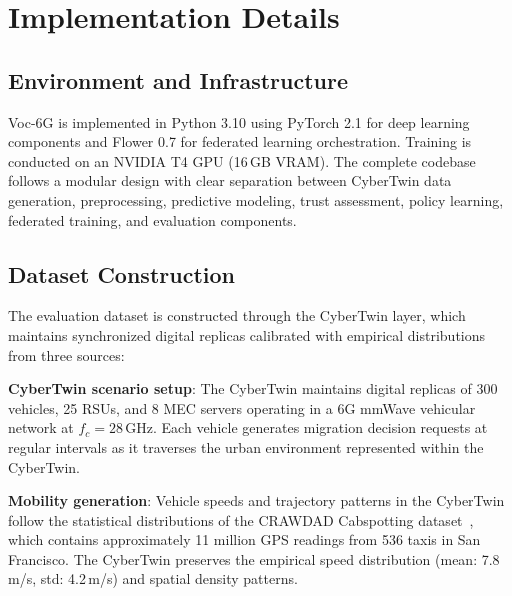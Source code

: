 \documentclass[journal,twoside]{IEEEtran}
\newcommand{\VocSixG}{Voc-6G}
\begin{document}
\section{Implementation Details}
\label{sec:implementation}

\subsection{Environment and Infrastructure}

\VocSixG{} is implemented in Python 3.10 using PyTorch 2.1 for deep learning components and Flower 0.7 for federated learning orchestration. Training is conducted on an NVIDIA T4 GPU (16\,GB VRAM). The complete codebase follows a modular design with clear separation between CyberTwin data generation, preprocessing, predictive modeling, trust assessment, policy learning, federated training, and evaluation components.

\subsection{Dataset Construction}

The evaluation dataset is constructed through the CyberTwin layer, which maintains synchronized digital replicas calibrated with empirical distributions from three sources:

\textbf{CyberTwin scenario setup}: The CyberTwin maintains digital replicas of 300 vehicles, 25 RSUs, and 8 MEC servers operating in a 6G mmWave vehicular network at $f_c = 28$\,GHz. Each vehicle generates migration decision requests at regular intervals as it traverses the urban environment represented within the CyberTwin.

\textbf{Mobility generation}: Vehicle speeds and trajectory patterns in the CyberTwin follow the statistical distributions of the CRAWDAD Cabspotting dataset~\cite{crawdad2009}, which contains approximately 11 million GPS readings from 536 taxis in San Francisco. The CyberTwin preserves the empirical speed distribution (mean: 7.8\,m/s, std: 4.2\,m/s) and spatial density patterns.
\end{document}
